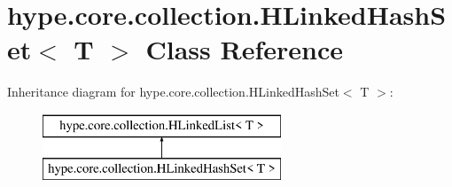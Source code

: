 \hypertarget{classhype_1_1core_1_1collection_1_1_h_linked_hash_set_3_01_t_01_4}{\section{hype.\-core.\-collection.\-H\-Linked\-Hash\-Set$<$ T $>$ Class Reference}
\label{classhype_1_1core_1_1collection_1_1_h_linked_hash_set_3_01_t_01_4}
}
Inheritance diagram for hype.\-core.\-collection.\-H\-Linked\-Hash\-Set$<$ T $>$\-:\begin{figure}[H]
\begin{center}
\leavevmode
\includegraphics[height=2.000000cm]{classhype_1_1core_1_1collection_1_1_h_linked_hash_set_3_01_t_01_4}
\end{center}
\end{figure}
